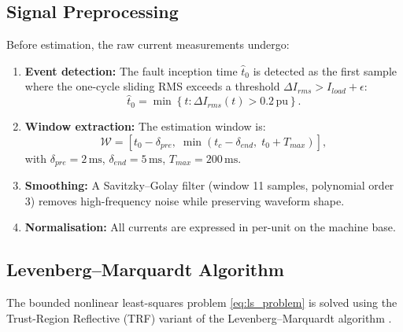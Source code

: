 \documentclass[12pt, a4paper]{article}
\theoremstyle{definition}
\theoremstyle{plain}
\newcommand{\pu}{\,\text{pu}}
\begin{document}
\subsection{Signal Preprocessing}
\label{sec:estimation:preprocessing}

Before estimation, the raw current measurements undergo:
\begin{enumerate}
  \item \textbf{Event detection:} The fault inception time $\hat{t}_0$ is
        detected as the first sample where the one-cycle sliding RMS exceeds
        a threshold $\Delta I_{rms} > I_{load} + \epsilon$:
        \begin{equation}
          \hat{t}_0 = \min\left\{t : \Delta I_{rms}(t) > 0.2\pu\right\}.
          \label{eq:event_detect}
        \end{equation}
  \item \textbf{Window extraction:} The estimation window is:
        \begin{equation}
          \mathcal{W} = \left[t_0 - \delta_{pre},\;
          \min(t_c - \delta_{end},\; t_0 + T_{max})\right],
          \label{eq:window}
        \end{equation}
        with $\delta_{pre} = 2\,\text{ms}$, $\delta_{end} = 5\,\text{ms}$, $T_{max} = 200\,\text{ms}$.
  \item \textbf{Smoothing:} A Savitzky--Golay filter (window 11 samples,
        polynomial order 3) removes high-frequency noise while preserving
        waveform shape.
  \item \textbf{Normalisation:} All currents are expressed in per-unit on the
        machine base.
\end{enumerate}

\subsection{Levenberg--Marquardt Algorithm}
\label{sec:estimation:lm}

The bounded nonlinear least-squares problem \cref{eq:ls_problem} is solved
using the Trust-Region Reflective (TRF) variant of the Levenberg--Marquardt
algorithm \citep{More1978, Branch1999}.
\end{document}
